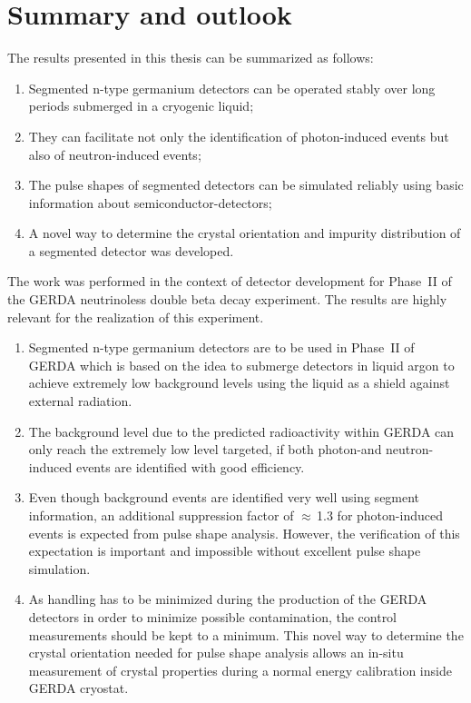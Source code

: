 \chapter{Summary and outlook} 
\label{cha:con} 
 
The results presented in this thesis can be summarized as follows:
\begin{enumerate}
\item Segmented n-type germanium detectors can be operated stably over long periods submerged in a cryogenic liquid;
\item They can facilitate not only the identification of photon-induced events but also of neutron-induced events;
\item The pulse shapes of segmented detectors can be simulated reliably using basic information about semiconductor-detectors;
\item A novel way to determine the crystal orientation and impurity distribution of a segmented detector was developed.
\end{enumerate}

The work was performed in the context of detector development for Phase~II of the GERDA neutrinoless double beta decay experiment. The results are highly relevant for the realization of this experiment.

\begin{enumerate}

\item Segmented n-type germanium detectors are to be used in Phase~II of GERDA which is based on the idea to submerge detectors in liquid argon to achieve extremely low background levels using the liquid as a shield against external radiation.
\item The background level due to the predicted radioactivity within GERDA can only reach the extremely low level targeted, if both photon-and neutron-induced events are identified with good efficiency.
\item Even though background events are identified very well using segment information, an additional suppression factor of $\approx$\,1.3 for photon-induced events is expected from pulse shape analysis. However, the verification of this expectation is important and impossible without excellent pulse shape simulation.
\item As handling has to be minimized during the production of the GERDA detectors in order to minimize possible contamination, the control measurements should be kept to a minimum. This novel way to determine the crystal orientation needed for pulse shape analysis allows an in-situ measurement of crystal properties during a normal energy calibration inside GERDA cryostat. 
\end{enumerate}

